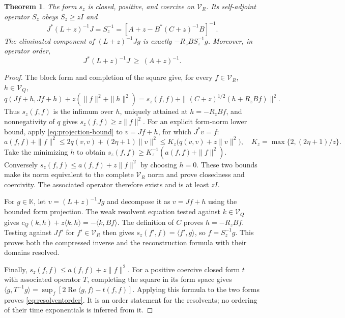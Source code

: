 \documentclass[11pt]{article}
\newtheorem{theorem}{Theorem}
\newcommand{\Rea}{\operatorname{Re}}
\begin{document}
\begin{theorem}\label{thm:Schur}
The form $s_z$ is closed, positive, and coercive on $\mathcal V_R$.
Its self-adjoint operator $S_z$ obeys $S_z\geq zI$ and
\begin{equation}\label{eq:Schurresolvent}
 J^*(L+z)^{-1}J=S_z^{-1}
   =\left[A+z-B^*(C+z)^{-1}B\right]^{-1}.
\end{equation}
The eliminated component of $(L+z)^{-1}Jg$ is exactly
$-R_zB S_z^{-1}g$. Moreover, in operator order,
\begin{equation}\label{eq:resolventorder}
 J^*(L+z)^{-1}J\ \geq\ (A+z)^{-1}.
\end{equation}
\end{theorem}
\begin{proof}
The block form and completion of the square give, for every
$f\in\mathcal V_R$, $h\in\mathcal V_Q$,
\begin{equation}\label{eq:square}
 q(Jf+h,Jf+h)+z(\|f\|^2+\|h\|^2)
 =s_z(f,f)+\|(C+z)^{1/2}(h+R_zBf)\|^2.
\end{equation}
Thus $s_z(f,f)$ is the infimum over $h$, uniquely attained at
$h=-R_zBf$, and nonnegativity of $q$ gives $s_z(f,f)\geq z\|f\|^2$.
For an explicit form-norm lower bound, apply
\eqref{eq:projection-bound} to $v=Jf+h$, for which $J^*v=f$:
\[
 a(f,f)+\|f\|^2
 \leq2q(v,v)+(2\eta+1)\|v\|^2
 \leq K_z\bigl(q(v,v)+z\|v\|^2\bigr),
 \quad K_z=\max\{2,(2\eta+1)/z\}.
\]
Take the minimizing $h$ to obtain
$s_z(f,f)\geq K_z^{-1}(a(f,f)+\|f\|^2)$.
Conversely $s_z(f,f)\leq a(f,f)+z\|f\|^2$ by choosing $h=0$.
These two bounds make its norm equivalent to the complete
$\mathcal V_R$ norm and prove closedness and coercivity. The
associated operator therefore exists and is at least $zI$.

For $g\in\mathbb K$, let $v=(L+z)^{-1}Jg$ and decompose it as
$v=Jf+h$ using the bounded form projection. The weak resolvent
equation tested against $k\in\mathcal V_Q$ gives
$c_Q(k,h)+z\langle k,h\rangle=-\langle k,Bf\rangle$.
The definition of $C$ proves $h=-R_zBf$. Testing against $Jf'$ for
$f'\in\mathcal V_R$ then gives
$s_z(f',f)=\langle f',g\rangle$, so $f=S_z^{-1}g$.
This proves both the compressed inverse and the reconstruction formula
with their domains resolved.

Finally, $s_z(f,f)\leq a(f,f)+z\|f\|^2$. For a positive coercive
closed form $t$ with associated operator $T$, completing the square in
its form space gives
$\langle g,T^{-1}g\rangle=\sup_f[2\Rea\langle g,f\rangle-t(f,f)]$.
Applying this formula to the two forms proves
\eqref{eq:resolventorder}. It is an order statement for the resolvents;
no ordering of their time exponentials is inferred from it.
\end{proof}
\end{document}
